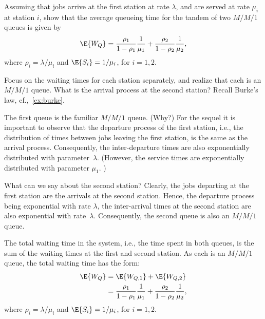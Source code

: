 \begin{exercise}
Assuming that jobs arrive at the first station at rate $\lambda$, and are served at rate $\mu_i$ at station $i$, show that the average queueing time for the tandem of two $M/M/1$ queues is given by
\begin{equation}
\E{W_Q}  = \frac{\rho_1}{1-\rho_1} \frac1{\mu_1} + \frac{\rho_2}{1-\rho_2} \frac1{\mu_2},
\end{equation}
where $\rho_i = \lambda/\mu_i$ and $\E{S_i} = 1/\mu_i$, for $i=1,2$. 
\begin{hint}
Focus on the waiting times for each station separately, and realize that each is an $M/M/1$ queue. What is the arrival process at the second station? Recall Burke's law, cf.,~\cref{ex:burke}.
\end{hint}
\begin{solution}
The first queue is the familiar $M/M/1$ queue.  (Why?) For the sequel
it is important to observe that the departure process of the first
station, i.e., the distribution of times between jobs leaving the
first station, is the same as the arrival process. Consequently, the
inter-departure times are also exponentially distributed with parameter~$\lambda$. (However, the service times are exponentially distributed
with parameter $\mu_1$. ) 

What can we say about the second station?  Clearly, the jobs departing
at the first station are the arrivals at the second station. Hence,
the departure process being exponential with rate $\lambda$, the
inter-arrival times at the second station are also exponential with
rate~$\lambda$. Consequently, the second queue is also an $M/M/1$
queue.

The total waiting time in the
system, i.e., the time spent in both queues, is the sum of the waiting
times at the first and second station. As each is an $M/M/1$ queue,
the total waiting time has the form:
\begin{equation}
  \begin{split}
\E{W_Q}  &= \E{W_{Q,1}} + \E{W_{Q,2}} \\
&= \frac{\rho_1}{1-\rho_1} \frac1{\mu_1} + \frac{\rho_2}{1-\rho_2} \frac1{\mu_2},
  \end{split}
\end{equation}
where $\rho_i = \lambda/\mu_i$ and $\E{S_i} = 1/\mu_i$, for $i=1,2$. 
\end{solution}
\end{exercise}


